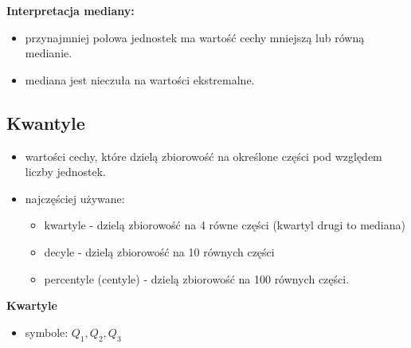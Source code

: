 \documentclass[
  polish,
  letterpaper,
  DIV=11,
  numbers=noendperiod]{scrreprt}
\providecommand{\tightlist}{%
  \setlength{\itemsep}{0pt}\setlength{\parskip}{0pt}}
\begin{document}
\textbf{Interpretacja mediany:}

\begin{itemize}
\tightlist
\item
  przynajmniej połowa jednostek ma wartość cechy mniejszą lub równą
  medianie.
\item
  mediana jest nieczuła na wartości ekstremalne.
\end{itemize}

\subsection{Kwantyle}\label{kwantyle}

\begin{itemize}
\tightlist
\item
  wartości cechy, które dzielą zbiorowość na określone części pod
  względem liczby jednostek.
\item
  najczęściej używane:

  \begin{itemize}
  \tightlist
  \item
    kwartyle - dzielą zbiorowość na 4 równe części (kwartyl drugi to
    mediana)
  \item
    decyle - dzielą zbiorowość na 10 równych części
  \item
    percentyle (centyle) - dzielą zbiorowość na 100 równych części.
  \end{itemize}
\end{itemize}

\textbf{Kwartyle}

\begin{itemize}
\tightlist
\item
  symbole: \(Q_1, Q_2, Q_3\)
\end{itemize}
\end{document}
